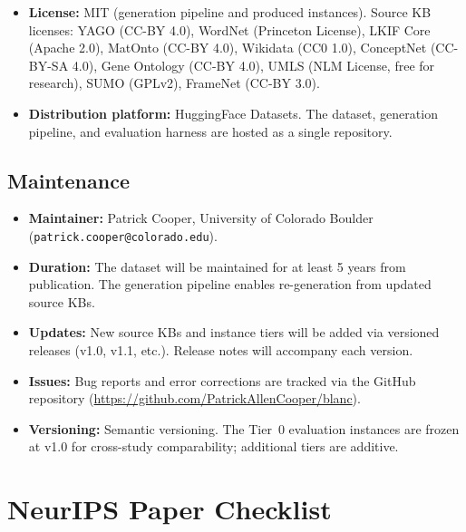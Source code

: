\documentclass{article}
\theoremstyle{definition}
\begin{document}
\begin{itemize}[nosep]
\item \textbf{License:} MIT (generation pipeline and produced instances). Source KB licenses: YAGO (CC-BY 4.0), WordNet (Princeton License), LKIF Core (Apache 2.0), MatOnto (CC-BY 4.0), Wikidata (CC0 1.0), ConceptNet (CC-BY-SA 4.0), Gene Ontology (CC-BY 4.0), UMLS (NLM License, free for research), SUMO (GPLv2), FrameNet (CC-BY 3.0).
\item \textbf{Distribution platform:} HuggingFace Datasets. The dataset, generation pipeline, and evaluation harness are hosted as a single repository.
\end{itemize}

\subsection*{Maintenance}

\begin{itemize}[nosep]
\item \textbf{Maintainer:} Patrick Cooper, University of Colorado Boulder (\texttt{patrick.cooper@colorado.edu}).
\item \textbf{Duration:} The dataset will be maintained for at least 5 years from publication. The generation pipeline enables re-generation from updated source KBs.
\item \textbf{Updates:} New source KBs and instance tiers will be added via versioned releases (v1.0, v1.1, etc.). Release notes will accompany each version.
\item \textbf{Issues:} Bug reports and error corrections are tracked via the GitHub repository (\url{https://github.com/PatrickAllenCooper/blanc}).
\item \textbf{Versioning:} Semantic versioning. The Tier~0 evaluation instances are frozen at v1.0 for cross-study comparability; additional tiers are additive.
\end{itemize}


\newpage
\section*{NeurIPS Paper Checklist}
\end{document}
